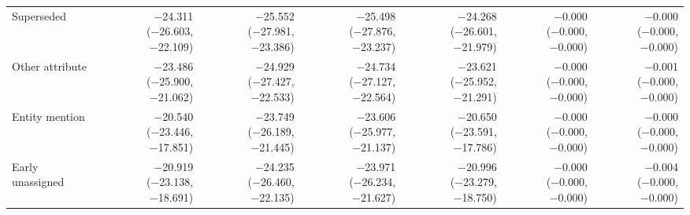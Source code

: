 \begin{table}[h]
\begin{center}
{\begin{tabular}{@{}lrrrrrr@{}}
Superseded & \shortstack[r]{−24.311\\[-1pt]\scriptsize(−26.603, −22.109)} & \shortstack[r]{−25.552\\[-1pt]\scriptsize(−27.981, −23.386)} & \shortstack[r]{−25.498\\[-1pt]\scriptsize(−27.876, −23.237)} & \shortstack[r]{−24.268\\[-1pt]\scriptsize(−26.601, −21.979)} & \shortstack[r]{−0.000\\[-1pt]\scriptsize(−0.000, −0.000)} & \shortstack[r]{−0.000\\[-1pt]\scriptsize(−0.000, −0.000)} \\
Other attribute & \shortstack[r]{−23.486\\[-1pt]\scriptsize(−25.900, −21.062)} & \shortstack[r]{−24.929\\[-1pt]\scriptsize(−27.427, −22.533)} & \shortstack[r]{−24.734\\[-1pt]\scriptsize(−27.127, −22.564)} & \shortstack[r]{−23.621\\[-1pt]\scriptsize(−25.952, −21.291)} & \shortstack[r]{−0.000\\[-1pt]\scriptsize(−0.000, −0.000)} & \shortstack[r]{−0.001\\[-1pt]\scriptsize(−0.000, −0.000)} \\
Entity mention & \shortstack[r]{−20.540\\[-1pt]\scriptsize(−23.446, −17.851)} & \shortstack[r]{−23.749\\[-1pt]\scriptsize(−26.189, −21.445)} & \shortstack[r]{−23.606\\[-1pt]\scriptsize(−25.977, −21.137)} & \shortstack[r]{−20.650\\[-1pt]\scriptsize(−23.591, −17.786)} & \shortstack[r]{−0.000\\[-1pt]\scriptsize(−0.000, −0.000)} & \shortstack[r]{−0.000\\[-1pt]\scriptsize(−0.000, −0.000)} \\
Early unassigned & \shortstack[r]{−20.919\\[-1pt]\scriptsize(−23.138, −18.691)} & \shortstack[r]{−24.235\\[-1pt]\scriptsize(−26.460, −22.135)} & \shortstack[r]{−23.971\\[-1pt]\scriptsize(−26.234, −21.627)} & \shortstack[r]{−20.996\\[-1pt]\scriptsize(−23.279, −18.750)} & \shortstack[r]{−0.000\\[-1pt]\scriptsize(−0.000, −0.000)} & \shortstack[r]{−0.004\\[-1pt]\scriptsize(−0.000, −0.000)} \\

\end{tabular}}
\end{center}
\end{table}
